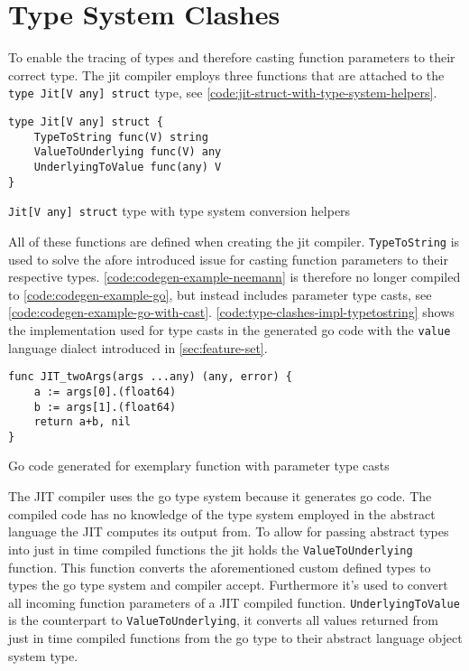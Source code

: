 \section{Type System Clashes}
\label{sec:type-system-clashes}

To enable the tracing of types and therefore casting function parameters to
their correct type. The jit compiler employs three functions that are attached
to the \texttt{type Jit[V any] struct} type, see
\autoref{code:jit-struct-with-type-system-helpers}.

\begin{listing}[H]
    \begin{verbatim}
type Jit[V any] struct {
	TypeToString func(V) string
	ValueToUnderlying func(V) any
	UnderlyingToValue func(any) V
}
    \end{verbatim}
    \caption{\texttt{Jit[V any] struct} type with type system conversion helpers}
    \label{code:jit-struct-with-type-system-helpers}
\end{listing}

All of these functions are defined when creating the jit compiler.
\texttt{TypeToString} is used to solve the afore introduced issue for
casting function parameters to their respective types.
\autoref{code:codegen-example-neemann} is therefore no longer compiled to
\autoref{code:codegen-example-go}, but instead includes parameter type
casts, see \autoref{code:codegen-example-go-with-cast}.
\autoref{code:type-clashes-impl-typetostring} shows the implementation used
for type casts in the generated go code with the \texttt{value} language
dialect introduced in \autoref{sec:feature-set}.

\begin{listing}[H]
    \begin{verbatim}
func JIT_twoArgs(args ...any) (any, error) { 
    a := args[0].(float64)
    b := args[1].(float64)
    return a+b, nil
}
    \end{verbatim}
    \caption{Go code generated for exemplary function with parameter type casts}
    \label{code:codegen-example-go-with-cast}
\end{listing}

The JIT compiler uses the go type system because it generates go code. The
compiled code has no knowledge of the type system employed in the abstract
language the JIT computes its output from. To allow for passing abstract types
into just in time compiled functions the jit holds the
\texttt{ValueToUnderlying} function. This function converts the aforementioned
custom defined types to types the go type system and compiler accept.
Furthermore it's used to convert all incoming function parameters of a JIT
compiled function. \texttt{UnderlyingToValue} is the counterpart to
\texttt{ValueToUnderlying}, it converts all values returned from just in time
compiled functions from the go type to their abstract language object system
type. 

